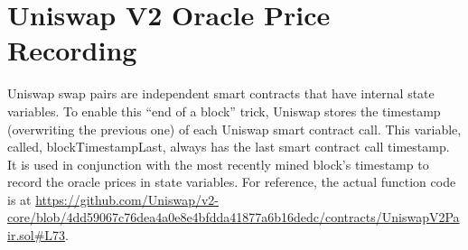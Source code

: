 \section{Uniswap V2 Oracle Price Recording}
\label{appendix_b}
Uniswap swap pairs are independent smart contracts that have internal state variables. To enable this ``end of a block'' trick, Uniswap stores the timestamp (overwriting the previous one) of each Uniswap smart contract call. This variable, called, blockTimestampLast, always has the last smart contract call timestamp. It is used in conjunction with the most recently mined block's timestamp to record the oracle prices in state variables. For reference, the actual function code is at \url{https://github.com/Uniswap/v2-core/blob/4dd59067c76dea4a0e8e4bfdda41877a6b16dedc/contracts/UniswapV2Pair.sol#L73}.